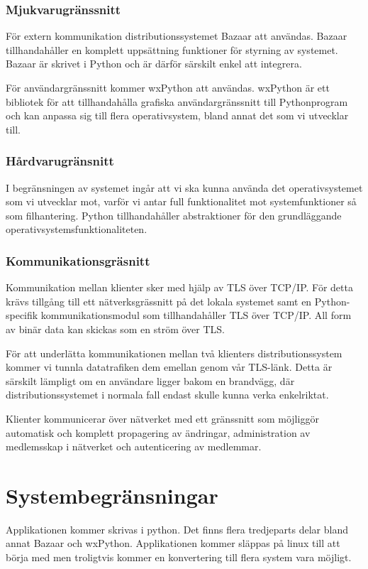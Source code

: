 \subsubsection{Mjukvarugränssnitt}
För extern kommunikation distributionssystemet Bazaar att användas. Bazaar tillhandahåller en komplett uppsättning funktioner för styrning av systemet. Bazaar är skrivet i Python och är därför särskilt enkel att integrera.

För användargränssnitt kommer wxPython att användas. wxPython är ett bibliotek för att tillhandahålla grafiska användargränssnitt till Pythonprogram och kan anpassa sig till flera operativsystem, bland annat det som vi utvecklar till.

\subsubsection{Hårdvarugränsnitt}
I begränsningen av systemet ingår att vi ska kunna använda det operativsystemet som vi utvecklar mot, varför vi antar full funktionalitet mot systemfunktioner så som filhantering. Python tillhandahåller abstraktioner för den grundläggande operativsystemsfunktionaliteten.

\subsubsection{Kommunikationsgräsnitt}
Kommunikation mellan klienter sker med hjälp av TLS över TCP/IP. För detta krävs tillgång till ett nätverksgrässnitt på det lokala systemet samt en Python-specifik kommunikationsmodul som tillhandahåller TLS över TCP/IP. All form av binär data kan skickas som en ström över TLS.

För att underlätta kommunikationen mellan två klienters distributionssystem kommer vi tunnla datatrafiken dem emellan genom vår TLS-länk. Detta är särskilt lämpligt om en användare ligger bakom en brandvägg, där distributionssystemet i normala fall endast skulle kunna verka enkelriktat.

Klienter kommunicerar över nätverket med ett gränssnitt som möjliggör automatisk och komplett propagering av ändringar, administration av medlemsskap i nätverket och autenticering av medlemmar.


\section{Systembegränsningar}
Applikationen kommer skrivas i python. Det finns flera tredjeparts delar bland annat Bazaar och wxPython. Applikationen kommer släppas på linux till att börja med men troligtvis kommer en konvertering till flera system vara möjligt.

